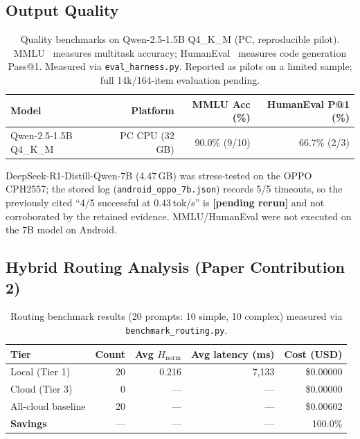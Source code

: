 \documentclass[11pt]{article}
\begin{document}
\subsection{Output Quality}
\label{sec:quality}

\begin{table}[h]
\centering
\caption{Quality benchmarks on Qwen-2.5-1.5B Q4\_K\_M (PC, reproducible pilot). MMLU~\cite{mmlu2020} measures multitask accuracy; HumanEval~\cite{humaneval2021} measures code generation Pass@1. Measured via \texttt{eval\_harness.py}. Reported as pilots on a limited sample; full 14k/164-item evaluation pending.}
\label{tab:quality}
\begin{tabular}{lrrr}
\toprule
Model & Platform & MMLU Acc (\%) & HumanEval P@1 (\%) \\
\midrule
Qwen-2.5-1.5B Q4\_K\_M & PC CPU (32 GB) & 90.0\% (9/10) & 66.7\% (2/3) \\
\bottomrule
\end{tabular}
\par\smallskip
\footnotesize DeepSeek-R1-Distill-Qwen-7B (4.47\,GB) was stress-tested on the OPPO CPH2557; the stored log (\texttt{android\_oppo\_7b.json}) records 5/5 timeouts, so the previously cited ``4/5 successful at 0.43\,tok/s'' is \textbf{[pending rerun]} and not corroborated by the retained evidence. MMLU/HumanEval were not executed on the 7B model on Android.
\end{table}

\subsection{Hybrid Routing Analysis (Paper Contribution 2)}
\label{sec:routing_results}

\begin{table}[h]
\centering
\caption{Routing benchmark results (20 prompts: 10 simple, 10 complex) measured via \texttt{benchmark\_routing.py}.}
\label{tab:routing}
\begin{tabular}{lrrrr}
\toprule
Tier & Count & Avg $H_{\text{norm}}$ & Avg latency (ms) & Cost (USD) \\
\midrule
Local (Tier 1) & 20 & 0.216 & 7,133 & \$0.00000 \\
Cloud (Tier 3) & 0 & — & — & \$0.00000 \\
\midrule
All-cloud baseline & 20 & — & — & \$0.00602 \\
\textbf{Savings} & — & — & — & 100.0\% \\
\bottomrule
\end{tabular}
\end{table}
\end{document}
